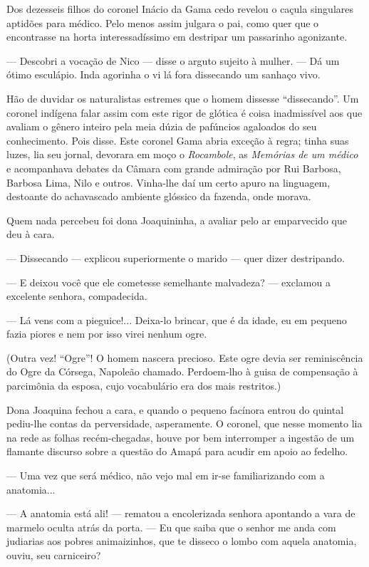 Dos dezesseis filhos do coronel Inácio da Gama cedo revelou o caçula
singulares aptidões para médico. Pelo menos assim julgara o pai, como
quer que o encontrasse na horta interessadíssimo em destripar um
passarinho agonizante.

--- Descobri a vocação de Nico --- disse o arguto sujeito à mulher. ---
Dá um ótimo esculápio. Inda agorinha o vi lá fora dissecando um sanhaço
vivo.

Hão de duvidar os naturalistas estremes que o homem dissesse
``dissecando''. Um coronel indígena falar assim com este rigor de
glótica é coisa inadmissível aos que avaliam o gênero inteiro pela meia
dúzia de pafúncios agaloados do seu conhecimento. Pois disse. Este
coronel Gama abria exceção à regra; tinha suas luzes, lia seu jornal,
devorara em moço o \emph{Rocambole}, as \emph{Memórias de um médico} e
acompanhava debates da Câmara com grande admiração por Rui Barbosa,
Barbosa Lima, Nilo e outros. Vinha-lhe daí um certo apuro na linguagem,
destoante do achavascado ambiente glóssico da fazenda, onde morava.

Quem nada percebeu foi dona Joaquininha, a avaliar pelo ar emparvecido
que deu à cara.

--- Dissecando --- explicou superiormente o marido --- quer dizer
destripando.

--- E deixou você que ele cometesse semelhante malvadeza? --- exclamou a
excelente senhora, compadecida.

--- Lá vens com a pieguice!... Deixa-lo brincar, que é da idade, eu em
pequeno fazia piores e nem por isso virei nenhum ogre.

(Outra vez! ``Ogre''! O homem nascera precioso. Este ogre devia ser
reminiscência do Ogre da Córsega, Napoleão chamado. Perdoem-lho à guisa
de compensação à parcimônia da esposa, cujo vocabulário era dos mais
restritos.)

Dona Joaquina fechou a cara, e quando o pequeno facínora entrou do
quintal pediu-lhe contas da perversidade, asperamente. O coronel, que
nesse momento lia na rede as folhas recém-chegadas, houve por bem
interromper a ingestão de um flamante discurso sobre a questão do Amapá
para acudir em apoio ao fedelho.

--- Uma vez que será médico, não vejo mal em ir-se familiarizando com a
anatomia...

--- A anatomia está ali! --- rematou a encolerizada senhora apontando a
vara de marmelo oculta atrás da porta. --- Eu que saiba que o senhor me
anda com judiarias aos pobres animaizinhos, que te disseco o lombo com
aquela anatomia, ouviu, seu carniceiro?

